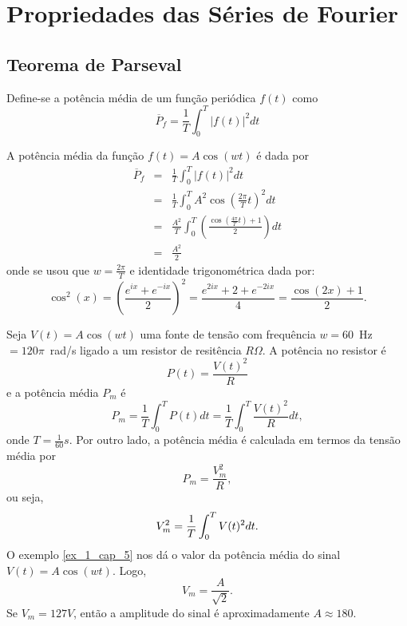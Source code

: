 
\chapter{Propriedades das Séries de Fourier}
\section{Teorema de Parseval}
\begin{defn} 
Define-se a potência média de um função periódica $f(t)$ como
\begin{equation}\overline{P}_f=\frac{1}{T}\int_0^T |f(t)|^2dt\end{equation}
\end{defn}
\begin{ex}{\label{ex_1_cap_5}} A potência média da função $f(t)=A\cos(wt)$ é dada por
\begin{eqnarray*}
\overline{P}_f&=&\frac{1}{T}\int_0^T |f(t)|^2dt\\
&=&\frac{1}{T}\int_0^{T} A^2\cos\left(\frac{2\pi}{T} t\right)^2dt\\
&=&\frac{A^2}{T}\int_0^{T} \left(\frac{\cos\left(\frac{4\pi}{T} t\right)+1}{2}  \right)dt\\
&=&\frac{A^2}{2}
\end{eqnarray*}
 onde se usou que $w=\frac{2\pi}{T}$ e identidade trigonométrica dada por:
\begin{equation}\cos^2(x)=\left(\frac{e^{ix}+e^{-ix}}{2}\right)^2=\frac{e^{2ix}+2+e^{-2ix}}{4}=\frac{\cos(2x)+1}{2}.\end{equation}
 \end{ex}
\begin{ex} Seja $V(t)=A\cos(wt)$ uma fonte de tensão com frequência $w=60$\ \!\!Hz $=120\pi$\ \!\!rad/s ligado a um resistor de resitência $R\Omega$. A potência no resistor é
\begin{equation}
P(t)=\frac{V(t)^2}{R}
\end{equation}
e a potência média $P_m$ é
\begin{equation}
P_m=\frac{1}{T}\int_0^TP(t)dt=\frac{1}{T}\int_0^T\frac{V(t)^2}{R}dt,
\end{equation}
onde $T=\frac{1}{60}s$. Por outro lado, a potência média é calculada em termos da tensão média por
\begin{equation}
P_m=\frac{V_m^2}{R},
\end{equation}
ou seja,
\begin{equation}{\label{valor_RMS}}
V_m^2=\frac{1}{T}\int_0^T V(t)^2 dt.
\end{equation}
O exemplo \ref{ex_1_cap_5} nos dá o valor da potência média do sinal $V(t)=A\cos(wt)$. Logo,
\begin{equation}
V_m=\frac{A}{\sqrt{2}}.
\end{equation}
Se $V_m=127V$, então a amplitude do sinal é aproximadamente $A\approx 180$.
\end{ex}
